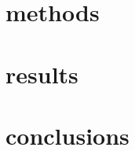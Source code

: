 \documentclass[prc,amsmath,twocolumn,superscriptaddress]{revtex4}
\begin{document}

\section{methods}
\label{methods}

\section{results}
\label{results}


\section{conclusions}
\label{conc}


\end{document}
